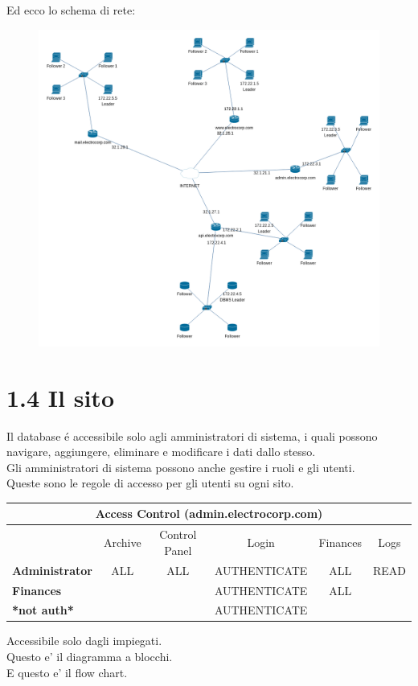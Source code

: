 \newpage
Ed ecco lo schema di rete:
\begin{figure}[H]
    \centering
    \includegraphics[width=\linewidth]{Figures/Rete.png}
\end{figure}
    
\section*{1.4 \hspace{1cm} Il sito}
Il database é accessibile solo agli amministratori di sistema, i quali possono navigare, aggiungere, eliminare e modificare i dati dallo stesso. \\

Gli amministratori di sistema possono anche gestire i ruoli e gli utenti. \\


Queste sono le regole di accesso per gli utenti su ogni sito.
\begin{center}
    \begin{tabular}{ |l|c|c|c|c|c| } 
        \hline
        \multicolumn{6}{|c|}{Access Control (admin.electrocorp.com)} \\
        \hline
                                        & Archive    & Control Panel            & Login        & Finances                & Logs \\
        \hline
            \textbf{Administrator}      & ALL        & ALL                      & AUTHENTICATE & ALL                     & READ \\
            \textbf{Finances}           &            &                          & AUTHENTICATE & ALL                     &  \\
            \textbf{*not auth*}         &            &                          & AUTHENTICATE &                         &  \\
        \hline
    \end{tabular}
\end{center}
Accessibile solo dagli impiegati. \\


Questo e' il diagramma a blocchi. \\


E questo e' il flow chart.
